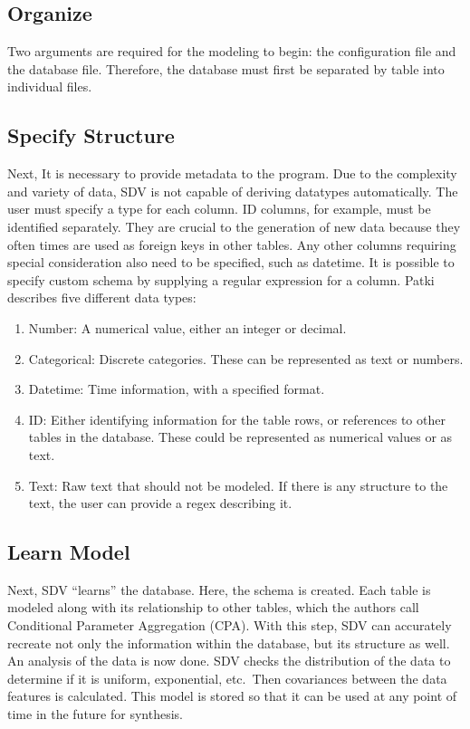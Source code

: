 \subsection{Organize}

Two arguments are required for the modeling to begin: the configuration file
and the database file. Therefore, the database must first be separated by
table into individual files.\cite{hid-sp18-526-patki-wedge-veer-sdv}

\subsection{Specify Structure}

Next, It is necessary to provide metadata to the program. Due to the
complexity and variety of data, SDV is not capable of deriving datatypes
automatically. The user must specify a type for each column. ID columns, for
example, must be identified separately. They are crucial to the generation
of new data because they often times are used as foreign keys in other
tables. Any other columns requiring special consideration also need to be
specified, such as datetime. It is possible to specify custom schema by
supplying a regular expression for a column. Patki describes five different
data types\cite{hid-sp18-526-patki-wedge-veer-sdv}:
\begin{enumerate}
    \item Number: A numerical value, either an integer or decimal.
    \item Categorical: Discrete categories. These can be represented as text
    or numbers.
    \item Datetime: Time information, with a specified format.
    \item ID: Either identifying information for the table rows, or references
    to other
tables in the database. These could be represented as numerical values or as
text.
    \item Text: Raw text that should not be modeled. If there is any structure
    to the
text, the user can provide a regex describing it.
\end{enumerate}

\subsection{Learn Model}

Next, SDV ``learns'' the database. Here, the schema is created. Each table is
modeled along with its relationship to other tables, which the authors call
Conditional Parameter Aggregation (CPA). With this step, SDV can accurately
recreate not only the information within the database, but its structure as
well. An analysis of the data is now done. SDV checks the distribution of the
data to determine if it is uniform, exponential, etc.\ Then covariances between
the data features is calculated. This model is stored so that it can be used
at any point of time in the future for synthesis.\cite{hid-sp18-526-patki-wedge-veer-sdv}

